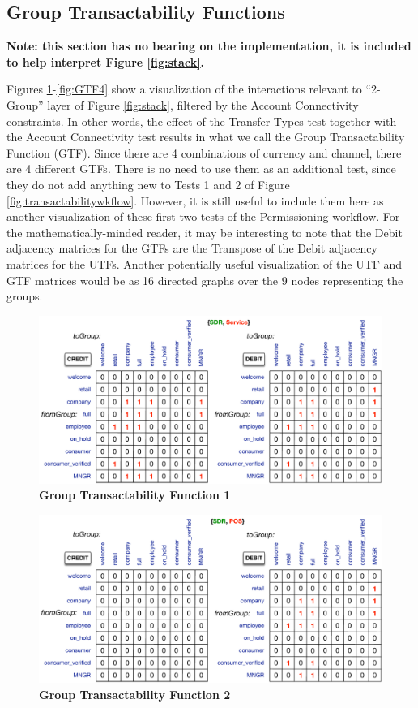 \subsection{Group Transactability Functions}
\textbf{\small Note: this section has no bearing on the implementation, it is included to help interpret Figure \ref{fig:stack}.}

Figures \ref{fig:GTF1}-\ref{fig:GTF4} show a visualization of the interactions relevant to ``2-Group'' layer of Figure \ref{fig:stack}, filtered by the Account Connectivity constraints. In other words, the effect of the Transfer Types test together with the Account Connectivity test results in what we call the Group Transactability Function (GTF). Since there are 4 combinations of currency and channel, there are 4 different GTFs. There is no need to use them as an additional test, since they do not add anything new to Tests 1 and 2 of Figure \ref{fig:transactabilitywkflow}. However, it is still useful to include them here as another visualization of these first two tests of the Permissioning workflow. For the mathematically-minded reader, it may be interesting to note that the Debit adjacency matrices for the GTFs are the Transpose of the Debit adjacency matrices for the UTFs. Another potentially useful visualization of the UTF and GTF matrices would be as 16 directed graphs over the 9 nodes representing the groups.

\begin{figure}[H]
\vspace{-0.5cm}
\centering
\includegraphics[width=16cm]{Figures/GTF1}
\caption{\small\textbf{Group Transactability Function 1}}
\label{fig:GTF1}
\end{figure}

\begin{figure}[H]
\vspace{-1cm}
\centering
\includegraphics[width=16cm]{Figures/GTF2}
\caption{\small\textbf{Group Transactability Function 2}}
\label{fig:GTF2}
\end{figure}

